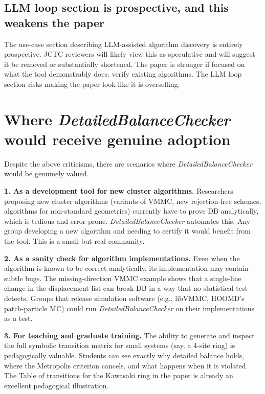 \documentclass[11pt,a4paper]{article}
\newcommand{\DBC}{\textit{DetailedBalanceChecker}}
\begin{document}
\subsection{LLM loop section is prospective, and this weakens the paper}

The use-case section describing LLM-assisted algorithm discovery is entirely
prospective.  JCTC reviewers will likely view this as speculative and will suggest
it be removed or substantially shortened.  The paper is stronger if focused on what
the tool demonstrably does: verify existing algorithms.  The LLM loop section
risks making the paper look like it is overselling.

\section{Where \DBC{} would receive genuine adoption}
\label{sec:adoption}

Despite the above criticisms, there are scenarios where \DBC{} would be genuinely
valued.

\textbf{1. As a development tool for new cluster algorithms.}  Researchers proposing
new cluster algorithms (variants of VMMC, new rejection-free schemes, algorithms for
non-standard geometries) currently have to prove DB analytically, which is tedious
and error-prone.  \DBC{} automates this.  Any group developing a new algorithm and
needing to certify it would benefit from the tool.  This is a small but real
community.

\textbf{2. As a sanity check for algorithm implementations.}  Even when the
algorithm is known to be correct analytically, its implementation may contain
subtle bugs.  The missing-direction VMMC example shows that a single-line change
in the displacement list can break DB in a way that no statistical test detects.
Groups that release simulation software (e.g., libVMMC, HOOMD's patch-particle MC)
could run \DBC{} on their implementations as a test.

\textbf{3. For teaching and graduate training.}  The ability to generate and inspect
the full symbolic transition matrix for small systems (say, a 4-site ring) is
pedagogically valuable.  Students can see exactly why detailed balance holds, where
the Metropolis criterion cancels, and what happens when it is violated.  The Table
of transitions for the Kawasaki ring in the paper is already an excellent
pedagogical illustration.
\end{document}
